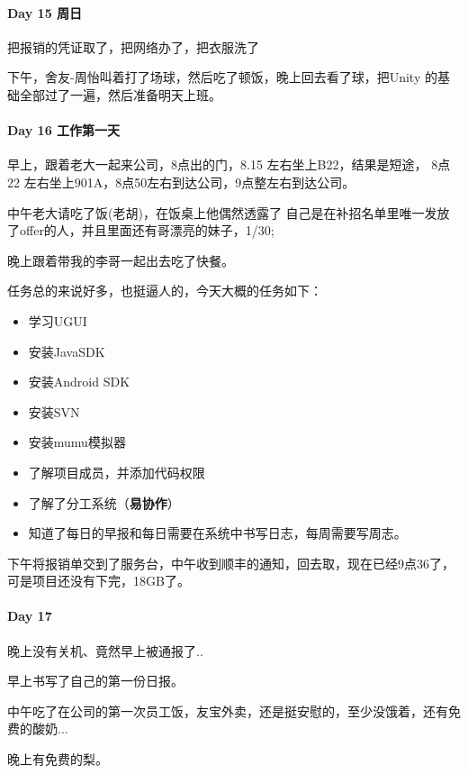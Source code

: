 \documentclass[UTF8,a4paper,8pt]{ctexart}
\begin{document}
 	 \paragraph{Day 15   周日   \quad     }
 	 	把报销的凭证取了，把网络办了，把衣服洗了
 	 	
 	 	下午，舍友-周怡叫着打了场球，然后吃了顿饭，晚上回去看了球，把Unity 的基础全部过了一遍，然后准备明天上班。
 	 	
 	 \paragraph{Day 16   工作第一天   \quad     }
 	 	早上，跟着老大一起来公司，8点出的门，8.15 左右坐上B22，结果是短途， 8点22 左右坐上901A，8点50左右到达公司，9点整左右到达公司。
 	 	
 	 	中午老大请吃了饭(老胡)，在饭桌上他偶然透露了 自己是在补招名单里唯一发放了offer的人，并且里面还有哥漂亮的妹子，1/30;
 	 	
 	    晚上跟着带我的李哥一起出去吃了快餐。
 	   
 	    任务总的来说好多，也挺逼人的，今天大概的任务如下：
 	    
 	   	\begin{itemize}
 	   		\item 学习UGUI
 	   		\item 安装JavaSDK
 	   		\item 安装Android SDK
 	   		\item 安装SVN
 	   		\item 安装mumu模拟器
 	   		\item 了解项目成员，并添加代码权限 
 	   		\item 了解了分工系统（\textbf{易协作}）
 	   		\item 知道了每日的早报和每日需要在系统中书写日志，每周需要写周志。
 	   	\end{itemize}
    	
    	下午将报销单交到了服务台，中午收到顺丰的通知，回去取，现在已经9点36了，可是项目还没有下完，18GB了。
 	 \paragraph{Day 17      \quad     }
 	 	晚上没有关机、竟然早上被通报了..
 	 	
 	 	早上书写了自己的第一份日报。
 	 	
 	 	中午吃了在公司的第一次员工饭，友宝外卖，还是挺安慰的，至少没饿着，还有免费的酸奶...
 	 	
 	 	晚上有免费的梨。
 	 	
\end{document}
